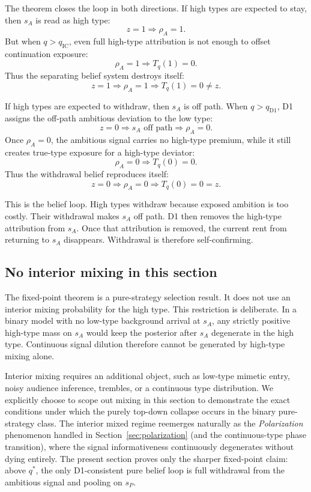 The theorem closes the loop in both directions. If high types are expected to stay, then \(s_A\) is read as high type:
\[
z=1\Rightarrow \rho_A=1.
\]
But when \(q>q_{\mathrm{IC}}\), even full high-type attribution is not enough to offset continuation exposure:
\[
\rho_A=1\Rightarrow T_q(1)=0.
\]
Thus the separating belief system destroys itself:
\[
z=1\Rightarrow \rho_A=1\Rightarrow T_q(1)=0\ne z.
\]

If high types are expected to withdraw, then \(s_A\) is off path. When \(q>q_{\mathrm{D1}}\), D1 assigns the off-path ambitious deviation to the low type:
\[
z=0\Rightarrow s_A\text{ off path}\Rightarrow \rho_A=0.
\]
Once \(\rho_A=0\), the ambitious signal carries no high-type premium, while it still creates true-type exposure for a high-type deviator:
\[
\rho_A=0\Rightarrow T_q(0)=0.
\]
Thus the withdrawal belief reproduces itself:
\[
z=0\Rightarrow \rho_A=0\Rightarrow T_q(0)=0=z.
\]

This is the belief loop. High types withdraw because exposed ambition is too costly. Their withdrawal makes \(s_A\) off path. D1 then removes the high-type attribution from \(s_A\). Once that attribution is removed, the current rent from returning to \(s_A\) disappears. Withdrawal is therefore self-confirming.

\subsection{No interior mixing in this section}
\label{subsec:no-mixing-sec6}

The fixed-point theorem is a pure-strategy selection result. It does not use an interior mixing probability for the high type. This restriction is deliberate. In a binary model with no low-type background arrival at \(s_A\), any strictly positive high-type mass on \(s_A\) would keep the posterior after \(s_A\) degenerate in the high type. Continuous signal dilution therefore cannot be generated by high-type mixing alone.

Interior mixing requires an additional object, such as low-type mimetic entry, noisy audience inference, trembles, or a continuous type distribution. We explicitly choose to scope out mixing in this section to demonstrate the exact conditions under which the purely top-down collapse occurs in the binary pure-strategy class. The interior mixed regime reemerges naturally as the \emph{Polarization} phenomenon handled in Section~\ref{sec:polarization} (and the continuous-type phase transition), where the signal informativeness continuously degenerates without dying entirely. The present section proves only the sharper fixed-point claim: above \(q^*\), the only D1-consistent pure belief loop is full withdrawal from the ambitious signal and pooling on \(s_P\).

